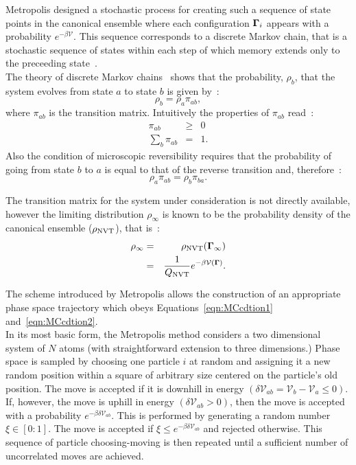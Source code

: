 Metropolis \etal designed a stochastic process for creating such a sequence of state points in
the canonical ensemble where each configuration $\mathbf{\Gamma}_i$ appears with a probability
$e^{-\beta\mathcal{V}}$. This sequence corresponds to a discrete Markov chain, that is a stochastic
sequence of states within each step of which memory extends only to the preceeding state~\cite{AandT}.\\

The theory of discrete Markov chains~\cite{theorySimpleLiquids} shows that the probability,
$\rho_b$, that the system evolves from state $a$ to state $b$ is given by~:
\begin{equation}
	\rho_b = \rho_a \pi_{ab},
\end{equation}
where $\pi_{ab}$ is the transition matrix. Intuitively the properties of $\pi_{ab}$ read~:
\begin{eqnarray}
	\pi_{ab} &\geq& 0\\
	\sum_{b}\pi_{ab} &=& 1.
	\label{eqn:MCcdtion1}
\end{eqnarray}
%
Also the condition of microscopic reversibility requires that the probability of going from state
$b$ to $a$ is equal to that of the reverse transition and, therefore~:
\begin{equation}
	\rho_a\pi_{ab} = \rho_b\pi_{ba}.
	\label{eqn:MCcdtion2}
\end{equation}

The transition matrix for the system under consideration is not directly available, however the 
limiting distribution $\rho_\infty$ is known to be the probability density of the canonical ensemble
($\rho_{\mathrm{NVT}}$), that is~:
\begin{eqnarray}
	\rho_{\infty} &=& \rho_{\mathrm{NVT}}(\mathbf{\Gamma}_\infty)\\
		 &=& \frac{1}{Q_{\mathrm{NVT}}}e^{-\beta\mathcal{V}(\mathbf{\Gamma})}.
\end{eqnarray}

The scheme introduced by Metropolis \etal allows the construction of an appropriate phase space
trajectory which obeys Equations~\ref{eqn:MCcdtion1} and~\ref{eqn:MCcdtion2}.\\

In its most basic form, the Metropolis method
considers a two dimensional system of $N$ atoms (with
straightforward extension to three dimensions.) Phase space is 
sampled by choosing one particle $i$ at random and assigning it a new random position within a
square of arbitrary size centered on the particle's old position. The move is accepted if it is
downhill in energy $(\delta\mathcal{V}_{ab} = \mathcal{V}_b - \mathcal{V}_a \leq 0)$. If,
however, the move is uphill in energy $(\delta\mathcal{V}_{ab} > 0)$, then the move is accepted 
with a probability $e^{-\beta\delta\mathcal{V}_{ab}}$. This is performed by generating a
random number $\xi \in [0:1]$. The move is accepted if $\xi \leq 
e^{-\beta\delta\mathcal{V}_{ab}}$ and rejected otherwise. This sequence of particle
choosing-moving is then repeated until a sufficient number of uncorrelated moves are achieved.\\

